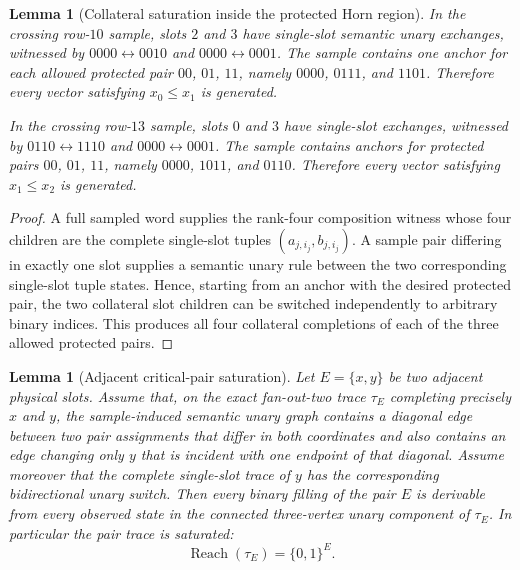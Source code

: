 \documentclass[11pt]{article}
\newtheorem{lemma}[definition]{Lemma}
\begin{document}
\begin{lemma}[Collateral saturation inside the protected Horn region]
\label{lem:collateral-saturation}
In the crossing row-$10$ sample, slots $2$ and $3$ have single-slot semantic
unary exchanges, witnessed by $0000\leftrightarrow0010$ and
$0000\leftrightarrow0001$.  The sample contains one anchor for each allowed
protected pair $00$, $01$, $11$, namely $0000$, $0111$, and $1101$.
Therefore every vector satisfying $x_0\le x_1$ is generated.

In the crossing row-$13$ sample, slots $0$ and $3$ have single-slot exchanges,
witnessed by $0110\leftrightarrow1110$ and
$0000\leftrightarrow0001$.  The sample contains anchors for protected pairs
$00$, $01$, $11$, namely $0000$, $1011$, and $0110$.  Therefore every vector
satisfying $x_1\le x_2$ is generated.
\end{lemma}

\begin{proof}
A full sampled word supplies the rank-four composition witness whose four
children are the complete single-slot tuples
$(a_{j,i_j},b_{j,i_j})$.  A sample pair differing in exactly one slot supplies
a semantic unary rule between the two corresponding single-slot tuple states.
Hence, starting from an anchor with the desired protected pair, the two
collateral slot children can be switched independently to arbitrary binary
indices.  This produces all four collateral completions of each of the three
allowed protected pairs.
\end{proof}


\begin{lemma}[Adjacent critical-pair saturation]
\label{lem:adjacent-pair-saturation}
Let $E=\{x,y\}$ be two adjacent physical slots.  Assume that, on the exact
fan-out-two trace $\tau_E$ completing precisely $x$ and $y$, the sample-induced
semantic unary graph contains a diagonal edge between two pair assignments
that differ in both coordinates and also contains an edge changing only $y$
that is incident with one endpoint of that diagonal.  Assume moreover that the
complete single-slot trace of $y$ has the corresponding bidirectional unary
switch.  Then every binary filling of the pair $E$ is derivable from every
observed state in the connected three-vertex unary component of $\tau_E$.
In particular the pair trace is saturated:
\[
  \boxed{\operatorname{Reach}(\tau_E)=\{0,1\}^{E}.}
\]
\end{lemma}
\end{document}
